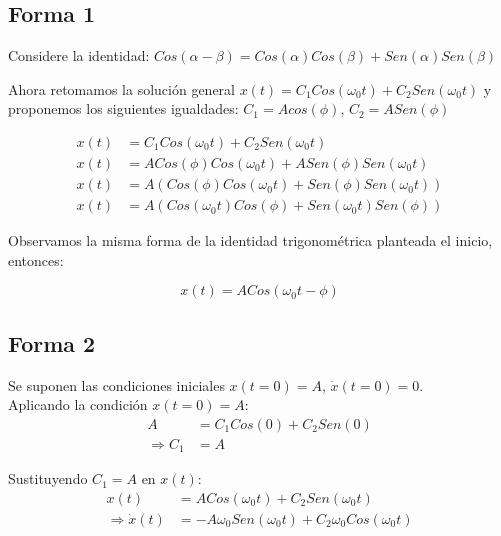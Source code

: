 


\subsection{Forma 1}

    Considere la identidad: $ Cos(\alpha - \beta) = Cos(\alpha)Cos(\beta)+Sen(\alpha)Sen(\beta) $

    \vspace*{0.3cm}

    Ahora retomamos la solución general $x(t) = C_{1}Cos(\omega_{0}t) + C_{2}Sen(\omega_{0}t)$ y proponemos los
    siguientes igualdades: $C_{1}=Acos(\phi)$, $C_{2}=ASen(\phi)$

    \begin{align*}
        x(t) &= C_{1}Cos(\omega_{0}t) + C_{2}Sen(\omega_{0}t) \\
        x(t) &= ACos(\phi)Cos(\omega_{0}t) + ASen(\phi)Sen(\omega_{0}t) \\
        x(t) &= A \left( Cos(\phi)Cos(\omega_{0}t) + Sen(\phi)Sen(\omega_{0}t) \right) \\
        x(t) &= A \left( Cos(\omega_{0}t)Cos(\phi) + Sen(\omega_{0}t)Sen(\phi) \right) 
    \end{align*}

    Observamos la misma forma de la identidad trigonométrica planteada el inicio, entonces:

    \begin{equation*}
        x(t) = ACos(\omega_{0}t-\phi)
    \end{equation*}


\subsection{Forma 2}

    Se suponen las condiciones iniciales $x(t=0)=A$, $\dot{x}(t=0)=0$.\\
    Aplicando la condición $x(t=0)=A$:
    \begin{align*}
        A &= C_{1}Cos(0)+C_{2}Sen(0)\\
        \Rightarrow C_{1} &= A
    \end{align*}

    Sustituyendo $C_{1}=A$ en $x(t)$:
    \begin{align*}
        x(t) &= ACos(\omega_{0}t)+C_{2}Sen(\omega_{0}t)\\
        \Rightarrow \dot{x}(t) &= -A\omega_{0}Sen(\omega_{0}t) + C_{2}\omega_{0}Cos(\omega_{0}t)
    \end{align*}

